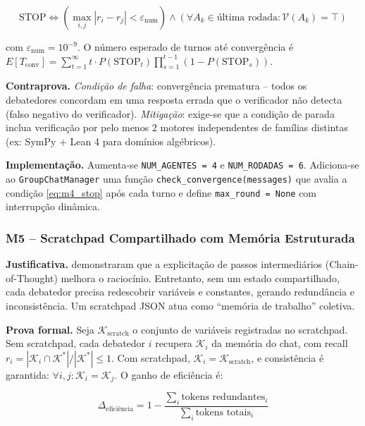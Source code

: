 \documentclass[5p]{elsarticle}
\theoremstyle{remark}
\begin{document}
\begin{equation}
\text{STOP} \iff \left( \max_{i,j} |r_i - r_j| < \varepsilon_{\text{num}} \right) \wedge \left( \forall A_k \in \text{última rodada}: \mathcal{V}(A_k) = \top \right)
\label{eq:m4_stop}
\end{equation}

com $\varepsilon_{\text{num}} = 10^{-9}$. O número esperado de turnos até convergência é $E[T_{\text{conv}}] = \sum_{t=1}^{\infty} t \cdot P(\text{STOP}_t) \prod_{s=1}^{t-1} (1 - P(\text{STOP}_s))$.

\textbf{Contraprova.} \textit{Condição de falha}: convergência prematura -- todos os debatedores concordam em uma resposta errada que o verificador não detecta (falso negativo do verificador). \textit{Mitigação}: exige-se que a condição de parada inclua verificação por pelo menos 2 motores independentes de famílias distintas (ex: SymPy + Lean 4 para domínios algébricos).

\textbf{Implementação.} Aumenta-se \texttt{NUM\_AGENTES = 4} e \texttt{NUM\_RODADAS = 6}. Adiciona-se ao \texttt{GroupChatManager} uma função \texttt{check\_convergence(messages)} que avalia a condição \ref{eq:m4_stop} após cada turno e define \texttt{max\_round = None} com interrupção dinâmica.

\subsubsection{M5 -- Scratchpad Compartilhado com Memória Estruturada}

\textbf{Justificativa.} \cite{Wei2022ChainOfThought} demonstraram que a explicitação de passos intermediários (Chain-of-Thought) melhora o raciocínio. Entretanto, sem um estado compartilhado, cada debatedor precisa redescobrir variáveis e constantes, gerando redundância e inconsistência. Um scratchpad JSON atua como ``memória de trabalho'' coletiva.

\textbf{Prova formal.} Seja $\mathcal{K}_{\text{scratch}}$ o conjunto de variáveis registradas no scratchpad. Sem scratchpad, cada debatedor $i$ recupera $\mathcal{K}_i$ da memória do chat, com recall $r_i = |\mathcal{K}_i \cap \mathcal{K}^*| / |\mathcal{K}^*| \leq 1$. Com scratchpad, $\mathcal{K}_i = \mathcal{K}_{\text{scratch}}$, e consistência é garantida: $\forall i, j: \mathcal{K}_i = \mathcal{K}_j$. O ganho de eficiência é:

\begin{equation}
\Delta_{\text{eficiência}} = 1 - \frac{\sum_i \text{tokens redundantes}_i}{\sum_i \text{tokens totais}_i}
\label{eq:m5_efficiency}
\end{equation}
\end{document}
